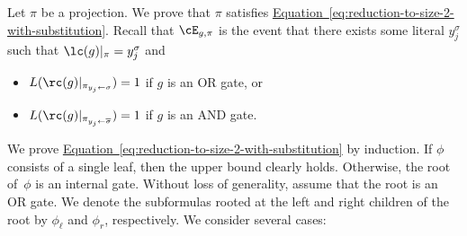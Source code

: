 \documentclass[11pt]{article}
\numberwithin{equation}{section}
\theoremstyle{definition}
\theoremstyle{plain}
\newcommand{\expref}[2]{\hyperref[#2]{#1~\ref{#2}}}
\theoremstyle{definition}\newtheorem{notation}[theorem]{Notation}\theoremstyle{plain}
\begin{document}
Let $\pi$ be a projection. We prove that $\pi$ satisfies \expref{Equation}{eq:reduction-to-size-2-with-substitution}.
Recall that $\cE_{g,\pi}$ is the event that there exists some literal
$y_{j}^{\sigma}$ such that $\lc(g)|_{\pi}=y_{j}^{\sigma}$ and
\begin{itemize}
\item $L(\rc(g)|_{\pi_{y_{j}\gets\sigma}})=1$ if $g$ is an OR gate, or 
\item $L(\rc(g)|_{\pi_{y_{j}\gets\overline{\sigma}}})=1$ if $g$ is an
AND gate. 
\end{itemize}
We prove \expref{Equation}{eq:reduction-to-size-2-with-substitution} by induction.
If $\phi$ consists of a single leaf, then the upper bound clearly
holds. Otherwise, the root of~$\phi$ is an internal gate. Without
loss of generality, assume that the root is an OR gate. We denote
the %
subformulas  %
rooted at the left and right children of the root
by $\phi_{\ell}$ and $\phi_{r}$, respectively. We consider several
cases: 
\end{document}

